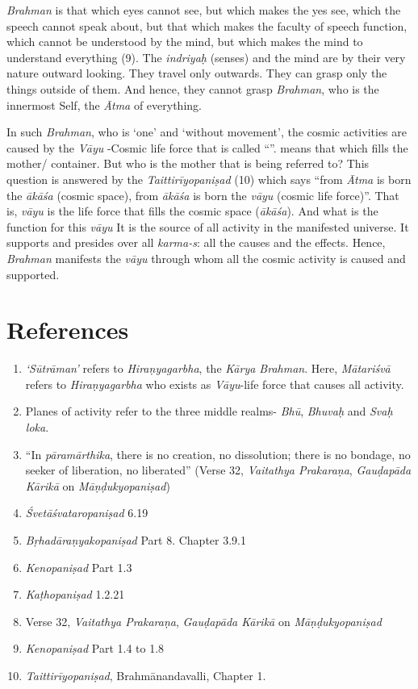 \emph{Brahman} is that which eyes cannot see, but which makes the yes see, which the speech cannot speak about, but that which makes the faculty of speech function, which cannot be understood by the mind, but which makes the mind to understand everything (9). The \emph{indriyaḥ} (senses) and the mind are by their very nature outward looking. They travel only outwards. They can grasp only the things outside of them. And hence, they cannot grasp \emph{Brahman}, who is the innermost Self, the \emph{Ātma} of everything.

In such \emph{Brahman}, who is `one' and `without movement', the cosmic activities are caused by the \emph{Vāyu} -Cosmic life force that is called ``''.  means that which fills the mother/ container. But who is the mother that is being referred to? This question is answered by the \emph{Taittirīyopaniṣad} (10) which says ``from \emph{Ātma} is born the \emph{ākāśa} (cosmic space), from \emph{ākāśa} is born the \emph{vāyu} (cosmic life force)''. That is, \emph{vāyu} is the life force that fills the cosmic space (\emph{ākāśa}). And what is the function for this \emph{vāyu} It is the source of all activity in the manifested universe. It supports and presides over all \emph{karma-s}: all the causes and the effects. Hence, \emph{Brahman} manifests the \emph{vāyu} through whom all the cosmic activity is caused and supported.

\section*{References}

\begin{enumerate}
\item
  \emph{`Sūtrāman'} refers to \emph{Hiraṇyagarbha}, the \emph{Kārya Brahman}. Here, \emph{Mātariśvā} refers to \emph{Hiraṇyagarbha} who exists as \emph{Vāyu}-life force that causes all activity.
\item
  Planes of activity refer to the three middle realms- \emph{Bhū}, \emph{Bhuvaḥ} and \emph{Svaḥ} \emph{loka}.
\item
  ``In \emph{pāramārthika}, there is no creation, no dissolution; there is no bondage, no seeker of liberation, no liberated'' (Verse 32, \emph{Vaitathya Prakaraṇa}, \emph{Gauḍapāda Kārikā} on \emph{Māṇḍukyopaniṣad})
\item
  \emph{Śvetāśvataropaniṣad} 6.19
\item
  \emph{Bṛhadāraṇyakopaniṣad} Part 8. Chapter 3.9.1
\item
  \emph{Kenopaniṣad} Part 1.3
\item
  \emph{Kaṭhopaniṣad} 1.2.21
\item
  Verse 32, \emph{Vaitathya Prakaraṇa}, \emph{Gauḍapāda Kārikā} on \emph{Māṇḍukyopaniṣad}
\item
  \emph{Kenopaniṣad} Part 1.4 to 1.8
\item
  \emph{Taittirīyopaniṣad}, Brahmānandavalli, Chapter 1.
\end{enumerate}
